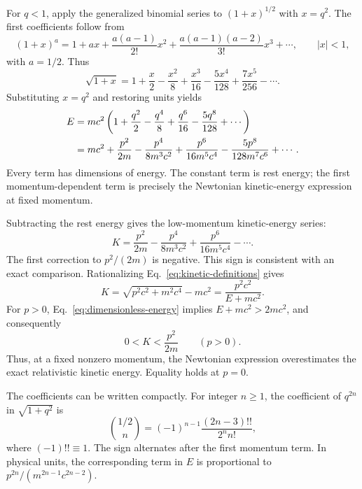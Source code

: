 \documentclass[12pt]{article}
\begin{document}
For $q<1$, apply the generalized binomial series to $(1+x)^{1/2}$ with $x=q^2$. The first coefficients follow from
\begin{equation}
  (1+x)^a=1+ax+\frac{a(a-1)}{2!}x^2
  +\frac{a(a-1)(a-2)}{3!}x^3+\cdots,
  \qquad |x|<1,
  \label{eq:binomial-series}
\end{equation}
with $a=1/2$. Thus
\begin{equation}
  \sqrt{1+x}
  =1+\frac{x}{2}-\frac{x^2}{8}+\frac{x^3}{16}
   -\frac{5x^4}{128}+\frac{7x^5}{256}-\cdots.
  \label{eq:sqrt-series}
\end{equation}
Substituting $x=q^2$ and restoring units yields
\begin{align}
  E
  &=mc^2\left(1+\frac{q^2}{2}-\frac{q^4}{8}
      +\frac{q^6}{16}-\frac{5q^8}{128}+\cdots\right) \notag\\
  &=mc^2+\frac{p^2}{2m}-\frac{p^4}{8m^3c^2}
      +\frac{p^6}{16m^5c^4}
      -\frac{5p^8}{128m^7c^6}+\cdots.
  \label{eq:low-momentum-energy}
\end{align}
Every term has dimensions of energy. The constant term is rest energy; the first momentum-dependent term is precisely the Newtonian kinetic-energy expression at fixed momentum.

Subtracting the rest energy gives the low-momentum kinetic-energy series:
\begin{equation}
  K=\frac{p^2}{2m}-\frac{p^4}{8m^3c^2}
      +\frac{p^6}{16m^5c^4}-\cdots.
  \label{eq:low-momentum-kinetic}
\end{equation}
The first correction to $p^2/(2m)$ is negative. This sign is consistent with an exact comparison. Rationalizing Eq.~\eqref{eq:kinetic-definitions} gives
\begin{equation}
  K=\sqrt{p^2c^2+m^2c^4}-mc^2
   =\frac{p^2c^2}{E+mc^2}.
  \label{eq:rationalized-kinetic}
\end{equation}
For $p>0$, Eq.~\eqref{eq:dimensionless-energy} implies
$E+mc^2>2mc^2$, and consequently
\begin{equation}
  0<K<\frac{p^2}{2m}\qquad (p>0).
  \label{eq:newtonian-upper-bound}
\end{equation}
Thus, at a fixed nonzero momentum, the Newtonian expression overestimates the exact relativistic kinetic energy. Equality holds at $p=0$.

The coefficients can be written compactly. For integer $n\geq 1$, the coefficient of $q^{2n}$ in $\sqrt{1+q^2}$ is
\begin{equation}
  {\binom{1/2}{n}}
  =(-1)^{n-1}\frac{(2n-3)!!}{2^n n!},
  \label{eq:low-coefficients}
\end{equation}
where $(-1)!!\equiv1$. The sign alternates after the first momentum term. In physical units, the corresponding term in $E$ is proportional to $p^{2n}/(m^{2n-1}c^{2n-2})$.
\end{document}
